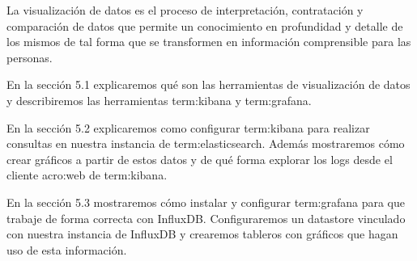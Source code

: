 La visualización de datos es el proceso de interpretación, contratación y
comparación de datos que permite un conocimiento en profundidad y detalle de
los mismos de tal forma que se transformen en información comprensible para las
personas.

En la sección 5.1 explicaremos qué son las herramientas de visualización de
datos y describiremos las herramientas \gls{term:kibana} y \gls{term:grafana}.

En la sección 5.2 explicaremos como configurar \gls{term:kibana} para realizar
consultas en nuestra instancia de \gls{term:elasticsearch}. Además mostraremos
cómo crear gráficos a partir de estos datos y de qué forma explorar los logs
desde el cliente \gls{acro:web} de \gls{term:kibana}.

En la sección 5.3 mostraremos cómo instalar y configurar \gls{term:grafana}
para que trabaje de forma correcta con InfluxDB. Configuraremos un datastore
vinculado con nuestra instancia de InfluxDB y crearemos tableros con gráficos
que hagan uso de esta información.

